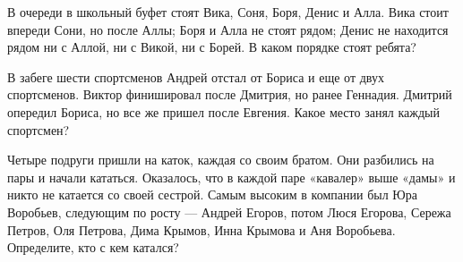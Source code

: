 \newpage

В очереди в школьный буфет стоят Вика, Соня, Боря, Денис и Алла. Вика стоит впереди Сони, но после Аллы; Боря и Алла не стоят рядом; Денис не находится рядом ни с Аллой, ни с Викой, ни с Борей. В каком порядке стоят ребята?


 В забеге шести спортсменов Андрей отстал от Бориса и еще от двух спортсменов. Виктор финишировал после Дмитрия, но ранее Геннадия. Дмитрий опередил Бориса, но все же пришел после Евгения. Какое место занял каждый спортсмен?

Четыре подруги пришли на каток, каждая со своим братом. Они разбились на пары и начали кататься. Оказалось, что в каждой паре «кавалер» выше «дамы» и никто не катается со своей сестрой. Самым высоким в компании был Юра Воробьев, следующим по росту — Андрей Егоров, потом Люся Егорова, Сережа Петров, Оля Петрова, Дима Крымов, Инна Крымова и Аня Воробьева. Определите, кто с кем катался?